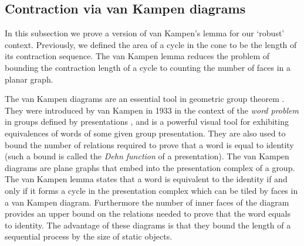 \documentclass[10pt,a4paper]{article}
\theoremstyle{definition}
\theoremstyle{remark}
\newcommand{\Authornotecolored}[3]{{\sffamily\small\color{#1}{[#2: #3]}}}
\newcommand{\Authornotecolored}[3]{}
\newcommand{\Ynote}{\Authornotecolored{Purple}{Y}}
\newcommand{\Snote}{\Authornotecolored{Green}{S}}
\newcommand{\snote}{\Snote}
\newcommand{\set}[1]{\{#1\}}
\def\cont{f}
\numberwithin{equation}{section}
\newcommand{\dir}[1]{\overset{\to}{#1}}
\newcommand{\coboundary}{{\delta}}
\def\cont{S}
\begin{document}


\subsection{Contraction via van Kampen diagrams}\label{sec:van-Kampen}
In this subsection we prove a version of van Kampen's lemma for our `robust' context. Previously, we defined the area of a cycle in the cone to be the length of its contraction sequence. The van Kampen lemma reduces the problem of bounding the contraction length of a cycle to counting the number of faces in a planar graph. 

The van Kampen diagrams are an essential tool in geometric group theorem \cite[Chapter V]{LyndonS1977}. They were introduced by van Kampen in 1933 in the context of the \emph{word problem} in groups defined by presentations \cite{VanKampen1933}, and is a powerful visual tool for exhibiting equivalences of words of some given group presentation. They are also used to bound the number of relations required to prove that a word is equal to identity (such a bound is called the \emph{Dehn function} of a presentation). 
The van Kampen diagrams are plane graphs that embed into the presentation complex of a group. 
\Ynote{I don't understand the following sentence:}\snote{Better now?} The van Kampen lemma states that a word is equivalent to the identity if and only if it forms a cycle in the presentation complex which can be tiled by faces in a van Kampen diagram. Furthermore the number of inner faces of the diagram provides an upper bound on the relations needed to prove that the word equals to identity. 
The advantage of these diagrams is that they bound the length of a sequential process by the size of static objects.
\end{document}
